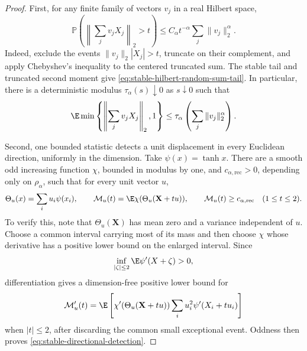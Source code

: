 \begin{proof}
First, for any finite family of vectors \(v_j\) in a real Hilbert space,
\begin{equation}
 \mathbb P\left(\left\|\sum_jv_jX_j\right\|_2>t\right)
 \le C_\alpha t^{-\alpha}\sum_j\|v_j\|_2^\alpha.
 \label{eq:stable-hilbert-random-sum-tail}
\end{equation}
Indeed, exclude the events
\(\|v_j\|_2|X_j|>t\), truncate on their complement, and apply Chebyshev's
inequality to the centered truncated sum.
The stable tail and truncated second moment give
\eqref{eq:stable-hilbert-random-sum-tail}.
In particular, there is a deterministic modulus
\(\tau_\alpha(s)\downarrow0\) as \(s\downarrow0\) such that
\begin{equation}
 \E\min\left\{\left\|\sum_jv_jX_j\right\|_2,1\right\}
 \le\tau_\alpha\left(\sum_j\|v_j\|_2^\alpha\right).
 \label{eq:stable-hilbert-random-sum-truncation}
\end{equation}

Second, one bounded statistic detects a unit displacement in every
Euclidean direction, uniformly in the dimension.
Take \(\psi(x)=\tanh x\).
There are a smooth odd increasing function \(\chi\), bounded in modulus by
one, and
\(c_{\alpha,\mathrm{rec}}>0\), depending only on \(\rho_\alpha\), such that for every unit
vector \(u\),
\begin{equation}
 \Theta_u(x)=\sum_i u_i\psi(x_i),
 \qquad
 \mathcal M_u(t)=\E\chi(\Theta_u(\mathbf X+tu)),
 \qquad
 \mathcal M_u(t)\ge c_{\alpha,\mathrm{rec}}\quad(1\le t\le2).
 \label{eq:stable-directional-detection}
\end{equation}
To verify this, note that \(\Theta_u(\mathbf X)\) has mean zero and a variance independent
of \(u\).
Choose a common interval carrying most of its mass and then choose \(\chi\)
whose derivative has a positive lower bound on the enlarged interval.
Since
\[
 \inf_{|\zeta|\le2}\E\psi'(X+\zeta)>0,
\]
differentiation gives a dimension-free positive lower bound for
\[
 \mathcal M_u'(t)=\E\left[
   \chi'(\Theta_u(\mathbf X+tu))\sum_i u_i^2\psi'(X_i+tu_i)
                 \right]
\]
when \(|t|\le2\), after discarding the common small exceptional event.
Oddness then proves \eqref{eq:stable-directional-detection}.


\end{proof}
